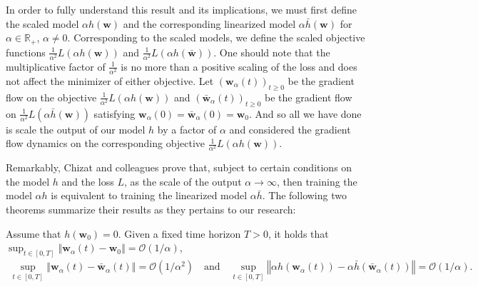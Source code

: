 \documentclass{article}
\newenvironment{manualtheorem}[1]{%
  \renewcommand\themanualtheoreminner{#1}%
  \manualtheoreminner
}{\endmanualtheoreminner}
\begin{document}
In order to fully understand this result and its implications, we must first define the scaled model $\alpha h(\boldsymbol{w})$ and the corresponding linearized model $\alpha \bar{h}(\boldsymbol{w})$ for $\alpha \in \mathbb{R}_+$, $\alpha \neq 0$. Corresponding to the scaled models, we define the scaled objective functions $\frac{1}{\alpha^2}L(\alpha h(\boldsymbol{w}))$ and $\frac{1}{\alpha^2}L(\alpha h(\boldsymbol{\bar{w}}))$. One should note that the multiplicative factor of $\frac{1}{\alpha^2}$ is no more than a positive scaling of the loss and does not affect the minimizer of either objective. Let $(\boldsymbol{w}_{\alpha}(t))_{t \geq 0}$ be the gradient flow on the objective $\frac{1}{\alpha^2}L(\alpha h(\boldsymbol{w}))$ and $(\boldsymbol{\bar{w}}_{\alpha}(t))_{t \geq 0}$ be the gradient flow on $\frac{1}{\alpha^2}L(\alpha \bar{h}(\boldsymbol{w}))$ satisfying $\boldsymbol{w}_{\alpha}(0) = \boldsymbol{\bar{w}}_{\alpha}(0) = \boldsymbol{w}_0$. And so all we have done is scale the output of our model $h$ by a factor of $\alpha$ and considered the gradient flow dynamics on the corresponding objective $\frac{1}{\alpha^2}L(\alpha h(\boldsymbol{w}))$.

Remarkably, Chizat and colleagues prove that, subject to certain conditions on the model $h$ and the loss $L$, as the scale of the output $\alpha \rightarrow \infty$, then training the model $\alpha h$ is equivalent to training the linearized model $\alpha \bar{h}$. The following two theorems summarize their results as they pertains to our research:

\begin{manualtheorem}{2.2}[from \cite{chizat2018lazy}]\label{Chizatthm2.2}
Assume that $h(\boldsymbol{w}_0) = 0$. Given a fixed time horizon $T > 0$, it holds that $\sup_{t \in [0, T]} \left\Vert \boldsymbol{w}_{\alpha}(t) - \boldsymbol{w}_0 \right\Vert = \mathcal{O}(1/\alpha)$,
\begin{align*}
    \sup_{t \in [0, T]} \left\Vert \boldsymbol{w}_{\alpha}(t) - \boldsymbol{\bar{w}}_{\alpha}(t) \right\Vert = \mathcal{O}(1/\alpha^2) \quad \text{and} \quad  \sup_{t \in [0, T]} \left\Vert \alpha h(\boldsymbol{w}_{\alpha}(t)) - \alpha \bar{h}(\boldsymbol{\bar{w}}_{\alpha}(t)) \right\Vert = \mathcal{O}(1/\alpha).
\end{align*}
\end{manualtheorem}
\end{document}
